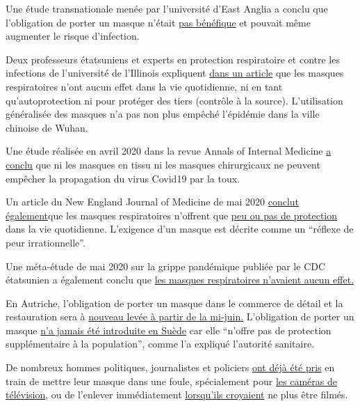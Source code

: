 Une étude transnationale menée par l'université d'East Anglia a conclu
que l'obligation de porter un masque n'était
\href{https://www.uea.ac.uk/about/-/new-study-reveals-blueprint-for-getting-out-of-covid-19-lockdown}{pas
bénéfique} et pouvait même augmenter le risque d'infection.

Deux professeurs étatsuniens et experts en protection respiratoire et
contre les infections de l'université de l'Illinois expliquent
\href{https://www.cidrap.umn.edu/news-perspective/2020/04/commentary-masks-all-covid-19-not-based-sound-data}{dans
un article} que les masques respiratoires n'ont aucun effet dans la vie
quotidienne, ni en tant qu'autoprotection ni pour protéger des tiers
(contrôle à la source). L'utilisation généralisée des masques n'a pas
non plus empêché l'épidémie dans la ville chinoise de Wuhan.

Une étude réalisée en avril 2020 dans la revue Annals of Internal
Medicine \href{https://www.acpjournals.org/doi/10.7326/M20-1342}{a
conclu} que ni les masques en tissu ni les masques chirurgicaux ne
peuvent empêcher la propagation du virus Covid19 par la toux.

Un article du New England Journal of Medicine de mai 2020
\href{https://www.acpjournals.org/doi/10.7326/M20-1342}{conclut
également}que les masques respiratoires n'offrent que
\href{https://www.nejm.org/doi/full/10.1056/NEJMp2006372}{peu ou pas de
protection} dans la vie quotidienne. L'exigence d'un masque est décrite
comme un ``réflexe de peur irrationnelle''.

Une méta-étude de mai 2020 sur la grippe pandémique publiée par le CDC
étatsunien a également conclu que
\href{https://wwwnc.cdc.gov/eid/article/26/5/19-0994_article}{les
masques respiratoires n'avaient aucun effet.}

En Autriche, l'obligation de porter un masque dans le commerce de détail
et la restauration sera à
\href{https://www.derstandard.at/story/2000117792769/die-maske-wird-wieder-zurueckgedraengt}{nouveau
levée à partir de la mi-juin.} L'obligation de porter un masque
\href{https://www.thelocal.se/20200514/explained-why-is-sweden-not-recommending-face-masks-to-the-public}{n'a
jamais été introduite en Suède} car elle ``n'offre pas de protection
supplémentaire à la population'', comme l'a expliqué l'autorité
sanitaire.

De nombreux hommes politiques, journalistes et policiers
\href{https://www.youtube.com/watch?v=y2qAKS6Hl4I}{ont déjà été pris} en
train de mettre leur masque dans une foule, spécialement pour
\href{https://twitter.com/DailyCaller/status/1265382872631980032}{les
caméras de télévision}, ou de l'enlever immédiatement
\href{https://twitter.com/realPowerTie/status/1261445611594723330}{lorsqu'ils
croyaient} ne plus être filmés.

